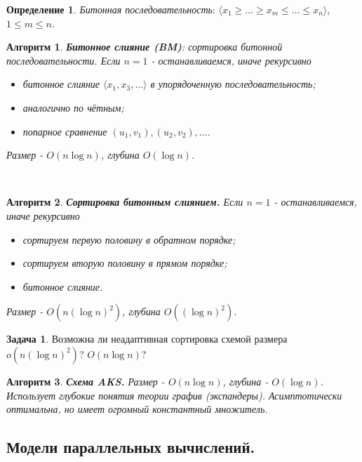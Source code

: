 \documentclass[a4paper]{article}
\theoremstyle{indented}
\newtheorem{alg}{Алгоритм}
\theoremstyle{definition}
\newtheorem{defn}{Определение}
\newtheorem{prob}{Задача}
\theoremstyle{remark}
\begin{document}
\begin{defn}
    \textit{Битонная последовательность}: $\langle x_1 \geq \ldots \geq x_m \leq \ldots \leq x_n \rangle$, $1\leq m \leq n$.
\end{defn}

\begin{alg}
    \textbf{Битонное слияние (BM)}: сортировка битонной последовательности. Если $n=1$ - останавливаемся, иначе рекурсивно

    \begin{itemize}
        \item битонное слияние $\langle x_1, x_3, \ldots \rangle $ в упорядоченную последовательность; 
        \item аналогично по чётным; 
        \item попарное сравнение $(u_1, v_1), (u_2, v_2), \ldots$. 
    \end{itemize}

    Размер - $O(n \log n)$, глубина $O(\log n)$. 
\end{alg} \ 

\begin{alg}
    \textbf{Сортировка битонным слиянием.} Если $n=1$ - останавливаемся, иначе рекурсивно

    \begin{itemize}
        \item сортируем первую половину в обратном порядке; 
        \item сортируем вторую половину в прямом порядке; 
        \item битонное слияние.
    \end{itemize}

    Размер - $O(n(\log n)^2)$, глубина $O((\log n)^2)$.
\end{alg}

\begin{prob}
    Возможна ли неадаптивная сортировка схемой размера $o(n(\log n)^2)$? $O(n \log n)$?
\end{prob}

\begin{alg}
    \textbf{Схема AKS.} Размер - $O(n \log n)$, глубина - $O(\log n)$. Использует глубокие понятия теории графив (\textit{экспандеры}). Асимптотически оптимальна, но имеет огромный константный множитель.
\end{alg}

\subsection{Модели параллельных вычислений.}
\end{document}
